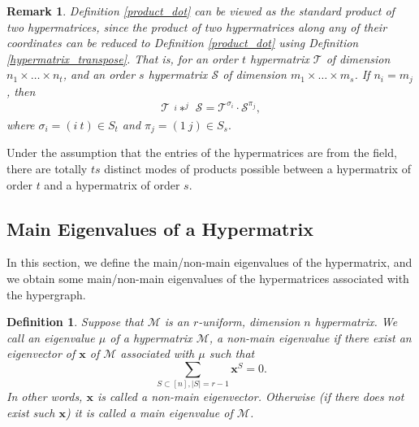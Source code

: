 \documentclass[10pt,a4paper]{article}
\newtheorem{definition}{Definition}[section]
\newtheorem{remark}{Remark}[section]
\begin{document}
	
	\begin{remark}
		Definition \ref{product_dot} can be viewed as the \emph{standard product} of two hypermatrices, since the product of two hypermatrices along any of their coordinates can be reduced to Definition \ref{product_dot} using Definition \ref{hypermatrix_transpose}. That is, for an order $t$ hypermatrix $\mathcal{T}$ of dimension $n_1 \times \ldots \times n_{t}$, and an order $s$ hypermatrix $\mathcal{S}$ of dimension $m_1 \times \ldots \times m_s$. If $n_i=m_j$, then 
		\begin{equation*}           
			\mathcal{T} \substack{^i * ^j} \mathcal{S} =\mathcal{T}^{\sigma_i} \cdot \mathcal{S}^{\pi_j}, 
		\end{equation*}       
		where $\sigma_i = (i ~ t) \in S_t$ and $\pi_j = (1 ~ j) \in S_s.$
	\end{remark}
	
	
	Under the assumption that the entries of the hypermatrices are from the field, there are totally $ts$ distinct modes of products possible between a hypermatrix of order $t$ and a hypermatrix of order $s$.
	
	
	
	
	
	\subsection{Main Eigenvalues of a Hypermatrix}
	
	In this section, we define the main/non-main eigenvalues of the hypermatrix, and we obtain some main/non-main eigenvalues of the hypermatrices associated with the hypergraph.
	
	\begin{definition}
		Suppose that $\mathcal{M}$ is an $r$-uniform, dimension $n$ hypermatrix. We call an eigenvalue $\mu$ of a hypermatrix $\mathcal{M}$, a non-main eigenvalue if there exist an eigenvector of $\mathbf{x}$ of $\mathcal{M}$ associated with $\mu$ such that 
		\begin{equation}\label{non-main_condition}
			\sum\limits_{S \subset [n], |S|=r-1} \mathbf{x}^S = 0.
		\end{equation}
		In other words, $\mathbf{x}$ is called a non-main eigenvector.
		Otherwise (if there does not exist such $\mathbf{x}$) it is called a main eigenvalue of $\mathcal{M}$. 
	\end{definition}
	
\end{document}
